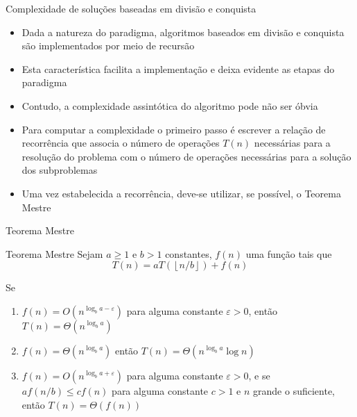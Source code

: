 \begin{frame}[fragile]{Complexidade de soluções baseadas em divisão e conquista}

    \begin{itemize}
        \item Dada a natureza do paradigma, algoritmos baseados em divisão e conquista são
            implementados por meio de recursão

        \item Esta característica facilita a implementação e deixa evidente as etapas do
            paradigma

        \item Contudo, a complexidade assintótica do algoritmo pode não ser óbvia

        \item Para computar a complexidade o primeiro passo é escrever a relação de recorrência
            que associa o número de operações $T(n)$ necessárias para a resolução do problema
            com o número de operações necessárias para a solução dos subproblemas

        \item Uma vez estabelecida a recorrência, deve-se utilizar, se possível, o Teorema Mestre
    \end{itemize}

\end{frame}

\begin{frame}[fragile]{Teorema Mestre}

    \begin{block}{Teorema Mestre}
        Sejam $a\geq 1$ e $b > 1$ constantes, $f(n)$ uma função tais que
        \[
            T(n) = aT\left(\left\lfloor n/b\right\rfloor\right) + f(n)
        \]

        Se
        \begin{enumerate} 
            \item $f(n) = O(n^{\log_b a - \varepsilon})$ para alguma constante $\varepsilon > 0$,
                então $T(n) = \Theta(n^{\log_b a})$

            \item $f(n) = \Theta(n^{\log_b a})$ então $T(n) = \Theta(n^{\log_b a}\log n)$

            \item $f(n) = O(n^{\log_b a + \varepsilon})$ para alguma constante $\varepsilon > 0$,
                e se $af(n/b) \leq cf(n)$ para alguma constante $c > 1$ e $n$ grande o suficiente,
                então $T(n) = \Theta(f(n))$
        \end{enumerate} 
    \end{block}

\end{frame}

